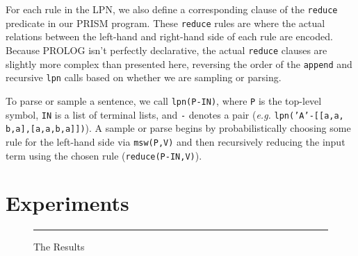 \documentclass[11pt, twocolumn]{article}
\begin{document}
For each rule in the LPN, we also define a corresponding clause of the {\tt reduce} predicate in our PRISM program. These {\tt reduce} rules are where the actual relations between the left-hand and right-hand side of each rule are encoded. Because PROLOG isn't perfectly declarative, the actual {\tt reduce} clauses are slightly more complex than presented here, reversing the order of the {\tt append} and recursive {\tt lpn} calls based on whether we are sampling or parsing.

To parse or sample a sentence, we call {\tt lpn(P-IN)}, where {\tt P} is the top-level symbol, {\tt IN} is a list of terminal lists, and {\tt -} denotes a pair ({\it e.g.} {\tt lpn('A'-[[a,a,
b,a],[a,a,b,a]])}). A sample or parse begins by probabilistically choosing some rule for the left-hand side via {\tt msw(P,V)} and then recursively reducing the input term using the chosen rule ({\tt reduce(P-IN,V)}). 
\section{Experiments}

\begin{figure}
	\rule{\linewidth}{3in}
	\caption{The Results}
	\label{fig:results}
\end{figure}
\end{document}
